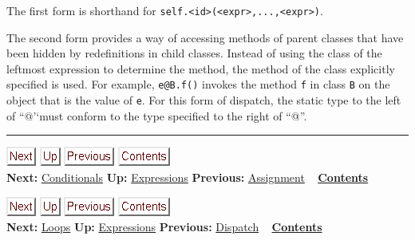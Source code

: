 \documentclass[]{article}
\begin{document}
The first form is shorthand for
\texttt{self.\textless{}id\textgreater{}(\textless{}expr\textgreater{},...,\textless{}expr\textgreater{})}.

The second form provides a way of accessing methods of parent classes
that have been hidden by redefinitions in child classes. Instead of
using the class of the leftmost expression to determine the method, the
method of the class explicitly specified is used. For example,
\texttt{e@B.f()} invokes the method \texttt{f} in class \texttt{B} on
the object that is the value of \texttt{e}. For this form of dispatch,
the static type to the left of ``@'`must conform to the type specified
to the right of ``@''.

\begin{center}\rule{3in}{0.4pt}\end{center}

\href{node18.html}{\includegraphics{next.png}}
\href{node13.html}{\includegraphics{up.png}}
\href{node16.html}{\includegraphics{prev.png}}
\href{node1.html}{\includegraphics{contents.png}} \\ \textbf{Next:}
\href{node18.html}{Conditionals} \textbf{Up:}
\href{node13.html}{Expressions} \textbf{Previous:}
\href{node16.html}{Assignment} ~ \textbf{\href{node1.html}{Contents}}

\href{node19.html}{\includegraphics{next.png}}
\href{node13.html}{\includegraphics{up.png}}
\href{node17.html}{\includegraphics{prev.png}}
\href{node1.html}{\includegraphics{contents.png}} \\ \textbf{Next:}
\href{node19.html}{Loops} \textbf{Up:} \href{node13.html}{Expressions}
\textbf{Previous:} \href{node17.html}{Dispatch} ~
\textbf{\href{node1.html}{Contents}} \\ \\
\end{document}
